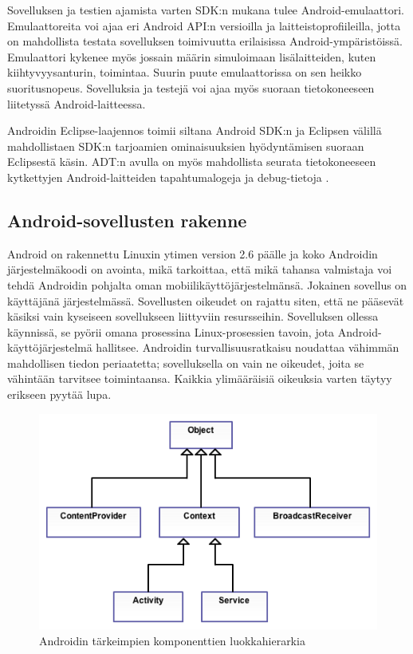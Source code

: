 Sovelluksen ja testien ajamista varten SDK:n mukana tulee Android-emulaattori. Emulaattoreita voi ajaa eri Android API:n versioilla ja laitteistoprofiileilla, jotta on mahdollista testata sovelluksen toimivuutta erilaisissa Android-ympäristöissä. Emulaattori kykenee myös jossain määrin simuloimaan lisälaitteiden, kuten kiihtyvyysanturin, toimintaa. Suurin puute emulaattorissa on sen heikko suoritusnopeus. Sovelluksia ja testejä voi ajaa myös suoraan tietokoneeseen liitetyssä Android-laitteessa. 

Androidin Eclipse-laajennos toimii siltana Android SDK:n ja Eclipsen välillä mahdollistaen SDK:n tarjoamien ominaisuuksien hyödyntämisen suoraan Eclipsestä käsin. ADT:n avulla on myös mahdollista seurata tietokoneeseen kytkettyjen Android-laitteiden tapahtumalogeja ja debug-tietoja \cite[25-50]{androidgamedev}.

\subsection{Android-sovellusten rakenne}

Android on rakennettu Linuxin ytimen version 2.6 päälle ja koko Androidin järjestelmäkoodi on avointa, mikä tarkoittaa, että mikä tahansa valmistaja voi tehdä Androidin pohjalta oman mobiilikäyttöjärjestelmänsä. Jokainen sovellus on käyttäjänä järjestelmässä. Sovellusten oikeudet on rajattu siten, että ne pääsevät käsiksi vain kyseiseen sovellukseen liittyviin resursseihin. Sovelluksen ollessa käynnissä, se pyörii omana prosessina Linux-prosessien tavoin, jota Android-käyttöjärjestelmä hallitsee. Androidin turvallisuusratkaisu noudattaa vähimmän mahdollisen tiedon periaatetta; sovelluksella on vain ne oikeudet, joita se vähintään tarvitsee toimintaansa. Kaikkia ylimääräisiä oikeuksia varten täytyy erikseen pyytää lupa.

\begin{figure}[htb]
\includegraphics[width=130mm]{class_diagram.png}
\caption{Androidin tärkeimpien komponenttien luokkahierarkia} \label{class_diagram}
\end{figure}

